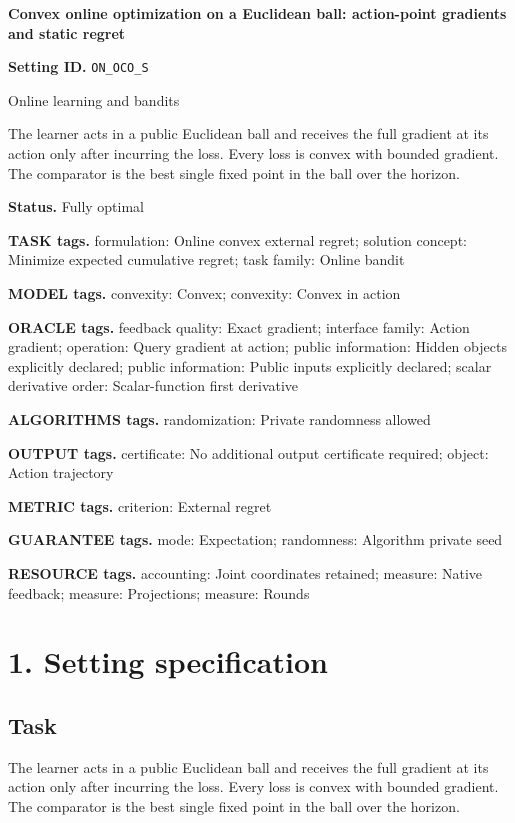 \documentclass[10pt,a4paper]{article}
\begin{document}
\raggedright

{\LARGE\bfseries\sffamily\color{AtlasNavy} Convex online optimization on a Euclidean ball: action-point gradients and static regret\par}\vspace{5pt}
\textbf{Setting ID.} \texttt{ON\_\allowbreak{}OCO\_\allowbreak{}S}

Online learning and bandits

The learner acts in a public Euclidean ball and receives the full gradient at its action only after incurring the loss. Every loss is convex with bounded gradient. The comparator is the best single fixed point in the ball over the horizon.

\textbf{Status.} Fully optimal

\textbf{TASK tags.} formulation: Online convex external regret; solution concept: Minimize expected cumulative regret; task family: Online bandit

\textbf{MODEL tags.} convexity: Convex; convexity: Convex in action

\textbf{ORACLE tags.} feedback quality: Exact gradient; interface family: Action gradient; operation: Query gradient at action; public information: Hidden objects explicitly declared; public information: Public inputs explicitly declared; scalar derivative order: Scalar-function first derivative

\textbf{ALGORITHMS tags.} randomization: Private randomness allowed

\textbf{OUTPUT tags.} certificate: No additional output certificate required; object: Action trajectory

\textbf{METRIC tags.} criterion: External regret

\textbf{GUARANTEE tags.} mode: Expectation; randomness: Algorithm private seed

\textbf{RESOURCE tags.} accounting: Joint coordinates retained; measure: Native feedback; measure: Projections; measure: Rounds

\section{1. Setting specification}
\subsection{Task}
The learner acts in a public Euclidean ball and receives the full gradient at its action only after incurring the loss. Every loss is convex with bounded gradient. The comparator is the best single fixed point in the ball over the horizon.
\end{document}
